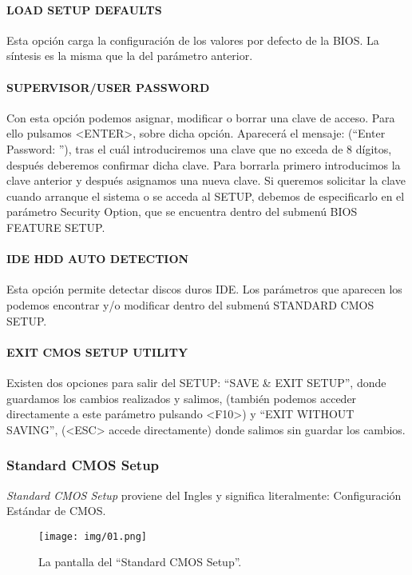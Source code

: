 			\paragraph{LOAD SETUP DEFAULTS}\label{LOAD SETUP DEFAULTS} Esta
			opción carga la configuración de los valores por defecto de la
			BIOS. La síntesis es la misma que la del parámetro anterior.

			\paragraph{SUPERVISOR/USER PASSWORD}\label{SUPERVISOR/USER
			PASSWORD} Con esta opción podemos asignar, modificar o borrar una
			clave de acceso. Para ello pulsamos <ENTER>, sobre dicha opción.
			Aparecerá el mensaje: (“Enter Password: ”), tras el cuál
			introduciremos una clave que no exceda de 8 dígitos, después
			deberemos confirmar dicha clave.  Para borrarla primero
			introducimos la clave anterior y después asignamos una nueva clave.
			Si queremos solicitar la clave cuando arranque el sistema o se
			acceda al SETUP, debemos de especificarlo en el parámetro Security
			Option, que se encuentra dentro del submenú BIOS FEATURE SETUP.
			\paragraph{IDE HDD AUTO DETECTION}\label{IHAD} Esta opción permite
			detectar discos duros IDE. Los parámetros que aparecen los podemos
			encontrar y/o modificar dentro del submenú STANDARD CMOS SETUP.
			
			\paragraph{EXIT CMOS SETUP UTILITY}\label{ECSU} Existen dos
			opciones para salir del SETUP: ``SAVE \& EXIT SETUP'', donde
			guardamos los cambios realizados y salimos, (también podemos
			acceder directamente a este parámetro pulsando <F10>) y “EXIT
			WITHOUT SAVING”, (<ESC> accede directamente) donde salimos sin
			guardar los cambios.

			\newpage
		\subsubsection{Standard CMOS Setup}\label{sub:Standard cmos setup}
			{\em Standard CMOS Setup} proviene del Ingles y significa literalmente:
			Configuración Estándar de CMOS.
			\begin{figure}[H]
				\centering
					\texttt{[image: img/01.png]}
				\caption{La pantalla del ``Standard CMOS Setup''.}
			\end{figure}
			
